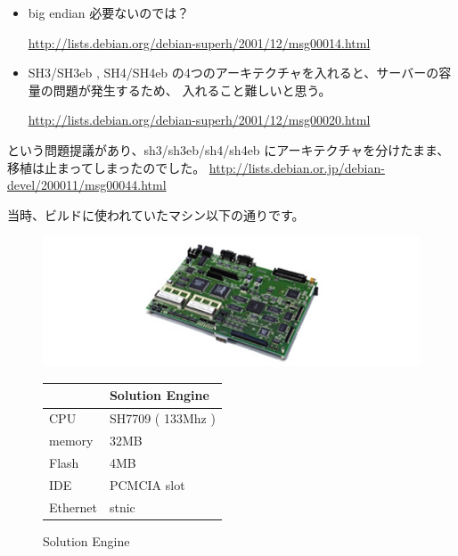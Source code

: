 \documentclass[mingoth,a4paper]{jsarticle}
\begin{document}
\begin{itemize}
	\item big endian 必要ないのでは？
	
		\url{http://lists.debian.org/debian-superh/2001/12/msg00014.html}
		
%	

	\item SH3/SH3eb , SH4/SH4eb の4つのアーキテクチャを入れると、サーバーの容量の問題が発生するため、
		入れること難しいと思う。
		
		\url{http://lists.debian.org/debian-superh/2001/12/msg00020.html}

\end{itemize}
という問題提議があり、sh3/sh3eb/sh4/sh4eb にアーキテクチャを分けたまま、移植は止まってしまったのでした。
\url{http://lists.debian.or.jp/debian-devel/200011/msg00044.html}

当時、ビルドに使われていたマシン以下の通りです。

\begin{figure}[htbp]
 \begin{minipage}{0.5\hsize}
  \begin{center}
   \includegraphics[width=0.7\hsize]{image200705/solutionengine.jpg}
  \end{center}
  \caption{Solution Engine}
 \end{minipage}
 \begin{minipage}{0.5\hsize}
  \begin{tabular}{|l|l|} \hline
   & Solution Engine \\ \hline
   CPU & SH7709 ( 133Mhz ) \\ \hline
   memory & 32MB\\ \hline
   Flash & 4MB \\ \hline 
   IDE  & PCMCIA slot \\ \hline
   Ethernet & stnic \\ \hline
  \end{tabular}
 \end{minipage}
\end{figure}
\end{document}
